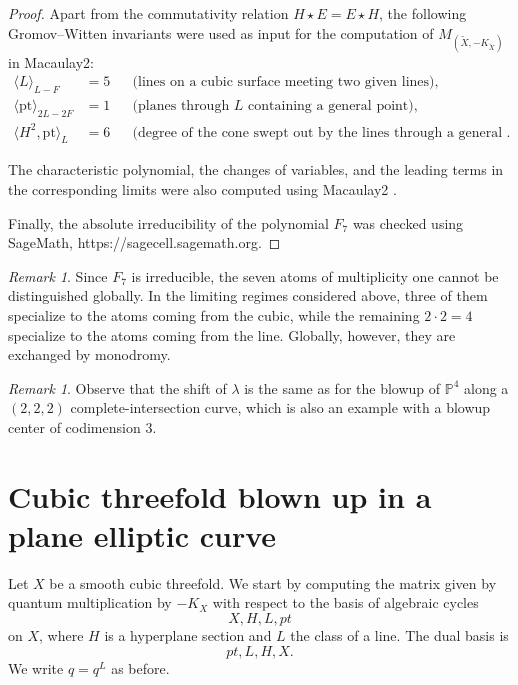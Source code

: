\documentclass[11pt]{amsart}
\theoremstyle{plain}
\numberwithin{equation}{section}
\theoremstyle{definition}
\theoremstyle{remark}
\newtheorem{remark}[theorem]{Remark}
\renewcommand{\P}{\mathbb P}
\begin{document}
\begin{proof}
Apart from the commutativity relation $H \star E = E \star H$, the following
Gromov--Witten invariants were used as input for the computation of
$M_{(\widetilde{X},-K_{\widetilde{X}})}$ in Macaulay2:
\begin{align*}
    \langle L \rangle_{L-F}
        &= 5
        && \text{(lines on a cubic surface meeting two given lines)}, \\
    \langle \mathrm{pt} \rangle_{2L-2F}
        &= 1
        && \text{(planes through $L$ containing a general point)}, \\
    \langle H^2,\mathrm{pt}\rangle_L
        &= 6
        && \text{(degree of the cone swept out by the lines through a general point)}.
\end{align*}

The characteristic polynomial, the changes of variables, and the leading
terms in the corresponding limits were also computed using Macaulay2 \cite{BvBS26}.

Finally, the absolute irreducibility of the polynomial $F_7$ was checked using SageMath, {\ttfamily https://sagecell.sagemath.org}.
\end{proof}


\begin{remark}
Since $F_7$ is irreducible, the seven atoms of multiplicity one cannot be
distinguished globally. In the limiting regimes considered above, three of
them specialize to the atoms coming from the cubic, while the remaining
$2 \cdot 2 = 4$ specialize to the atoms coming from the line. Globally, however,
they are exchanged by monodromy.
\end{remark}

\begin{remark}
Observe that the shift of $\lambda$ is the same as for the blowup of $\P^4$
along a $(2,2,2)$ complete-intersection curve, which is also an example with
a blowup center of codimension $3$.
\end{remark}



\section{Cubic threefold blown up in a plane elliptic curve}\label{sElliptic}

Let $X$ be a smooth cubic threefold. We start by computing the matrix given by quantum multiplication by $-K_X$ with respect to the basis of algebraic cycles 
\[
X, H, L, pt
\]
on $X$, where $H$ is a hyperplane section and $L$ the class of a line. The dual basis is 
\[
pt, L, H, X .
\]
We write $q=q^L$ as before. 
\end{document}
